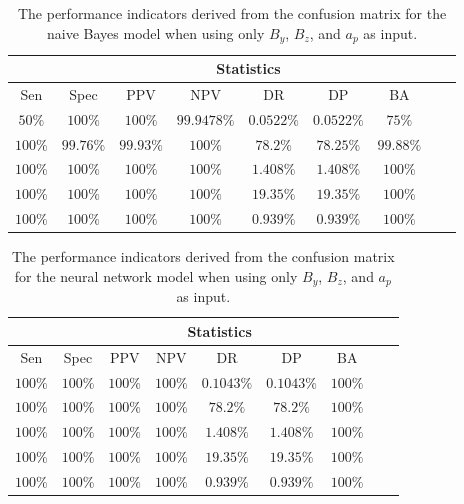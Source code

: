 \begin{table}[!ht]
	\centering
	\begin{tabular}{|c|c|c|c|c|c|c|c|c|}
		\hline
		 & \multicolumn{7}{c|}{Statistics} \\ \hline
		Sen & Spec & PPV & NPV & DR & DP & BA \\ \hline
		$50\%$ & $100\%$ & $100\%$ & $99.9478\%$ & $0.0522\%$ & $0.0522\%$ & $75\%$ \\ \hline
		$100\%$ & $99.76\%$ & $99.93\%$ & $100\%$ & $78.2\%$ & $78.25\%$ & $99.88\%$ \\ \hline
		$100\%$ & $100\%$ & $100\%$ & $100\%$ & $1.408\%$ & $1.408\%$ & $100\%$ \\ \hline
		$100\%$ & $100\%$ & $100\%$ & $100\%$ & $19.35\%$ & $19.35\%$ & $100\%$ \\ \hline
		$100\%$ & $100\%$ & $100\%$ & $100\%$ & $0.939\%$ & $0.939\%$ & $100\%$ \\ \hline
	\end{tabular}
	\caption{The performance indicators derived from the confusion matrix for the naive Bayes model when using only $B_{y}$, $B_{z}$, and $a_{p}$ as input.}
	\label{tab:cs:yzap:nb}
\end{table}

\begin{table}[!ht]
	\centering
	\begin{tabular}{|c|c|c|c|c|c|c|c|c|}
		\hline
		 & \multicolumn{7}{c|}{Statistics} \\ \hline
		Sen & Spec & PPV & NPV & DR & DP & BA \\ \hline
		$100\%$ & $100\%$ & $100\%$ & $100\%$ & $0.1043\%$ & $0.1043\%$ & $100\%$ \\ \hline
		$100\%$ & $100\%$ & $100\%$ & $100\%$ & $78.2\%$ & $78.2\%$ & $100\%$ \\ \hline
		$100\%$ & $100\%$ & $100\%$ & $100\%$ & $1.408\%$ & $1.408\%$ & $100\%$ \\ \hline
		$100\%$ & $100\%$ & $100\%$ & $100\%$ & $19.35\%$ & $19.35\%$ & $100\%$ \\ \hline
		$100\%$ & $100\%$ & $100\%$ & $100\%$ & $0.939\%$ & $0.939\%$ & $100\%$ \\ \hline
	\end{tabular}
	\caption{The performance indicators derived from the confusion matrix for the neural network model when using only $B_{y}$, $B_{z}$, and $a_{p}$ as input.}
	\label{tab:cs:yzap:nnet}
\end{table}

